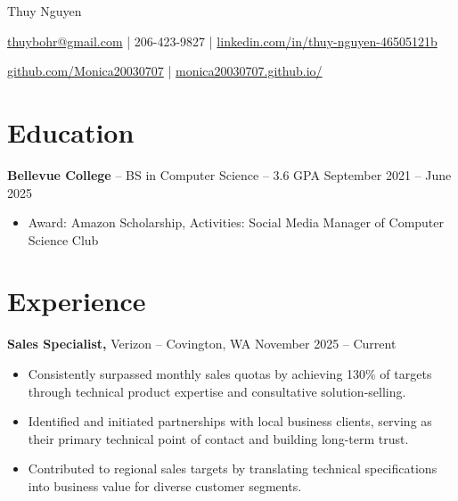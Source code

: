 \documentclass[11pt]{article}       %
\begin{document}
\centerline{\Huge Thuy Nguyen}

\vspace{5pt}

\centerline{\href{mailto:thuybohr@gmail.com}{thuybohr@gmail.com} | 206-423-9827 |
\href{https://www.linkedin.com/in/thuy-nguyen-46505121b/}{linkedin.com/in/thuy-nguyen-46505121b}}

\centerline{\href{https://github.com/Monica20030707}{github.com/Monica20030707} | 
\href{https://monica20030707.github.io/}{monica20030707.github.io/}} 

\vspace{-9pt}

\section*{Education}
\textbf{Bellevue College} -- BS in Computer Science -- 3.6 GPA \hfill September 2021 -- June 2025\\
\vspace{-9pt}
\begin{itemize}
  \item Award: Amazon Scholarship, Activities: Social Media Manager of Computer Science Club
\end{itemize}

\vspace{-18.5pt}

\section*{Experience}

\textbf{Sales Specialist,} {Verizon} -- Covington, WA \hfill November 2025 -- Current \\
\vspace{-9pt}
\begin{itemize}
  \item Consistently surpassed monthly sales quotas by achieving 130\% of targets through technical product expertise and consultative solution-selling.
  \item Identified and initiated partnerships with local business clients, serving as their primary technical point of contact and building long-term trust.
  \item Contributed to regional sales targets by translating technical specifications into business value for diverse customer segments.
\end{itemize}
\end{document}
